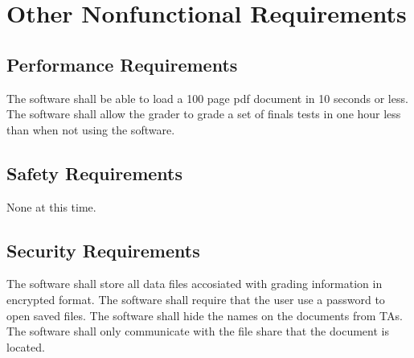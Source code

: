 \section{Other Nonfunctional Requirements}
%

\subsection{Performance Requirements}

The software shall be able to load a 100 page pdf document in 10 seconds or less.
The software shall allow the grader to grade a set of finals tests in one hour less than when not using the software.

\subsection{Safety Requirements}
None at this time.

\subsection{Security Requirements}
%

The software shall store all data files accosiated with grading information in encrypted format. 
The software shall require that the user use a password to open saved files. 
The software shall hide the names on the documents from TAs. 
The software shall only communicate with the file share that the document is located.

